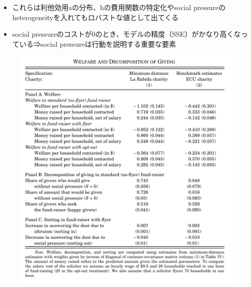 \documentclass[../root]{subfiles}
\begin{document}
    \begin{itemize}
        \item これらは利他効用aの分布、hの費用関数の特定化やsocial pressureのheterogeneityを入れてもロバストな値として出てくる
        \item social pressureのコストが0のとき、モデルの精度（SSE）がかなり高くなっている⇒social pressureは行動を説明する重要な要素
    \end{itemize}

    \begin{figure}[h]
        \centering
        \includegraphics[width = .6\linewidth]{0821kato/fig11_2.png}
        \label{}
    \end{figure}
\end{document}
